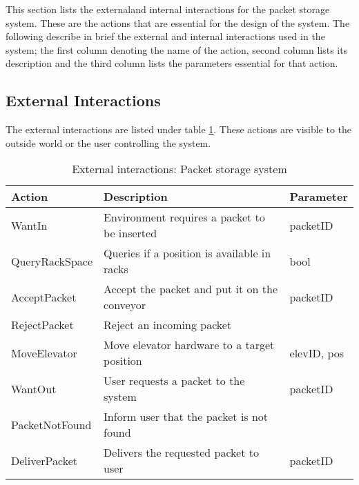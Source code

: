 \label{sec:ext_interactions}
This section lists the externaland internal interactions for the packet storage system. These are the actions that are essential for the design of the system. The following describe in brief the external and internal interactions used in the system; the first column denoting the name of the action, second column lists its description and the third column lists the parameters essential for that action.

\subsection*{External Interactions}
The external interactions are listed under table \ref{tab: extr_interactions}. These actions are visible to the outside world or the user controlling the system.
\begin{table}[ht]
\centering
\begin{tabular}{|l|l|l|}\hline
Action & Description & Parameter \\\hline
WantIn & Environment requires a packet to be inserted & packetID \\\hline
QueryRackSpace & Queries if a position is available in racks & bool \\\hline
AcceptPacket & Accept the packet and put it on the conveyor & packetID \\\hline
RejectPacket & Reject an incoming packet & \\\hline
MoveElevator & Move elevator hardware to a target position & elevID, pos \\\hline
WantOut & User requests a packet to the system & packetID \\\hline
PacketNotFound & Inform user that the packet is not found & \\\hline
DeliverPacket & Delivers the requested packet to user & packetID \\\hline
\end{tabular}
\caption{External interactions: Packet storage system }
\label{tab: extr_interactions}
\end{table}
\pagebreak
